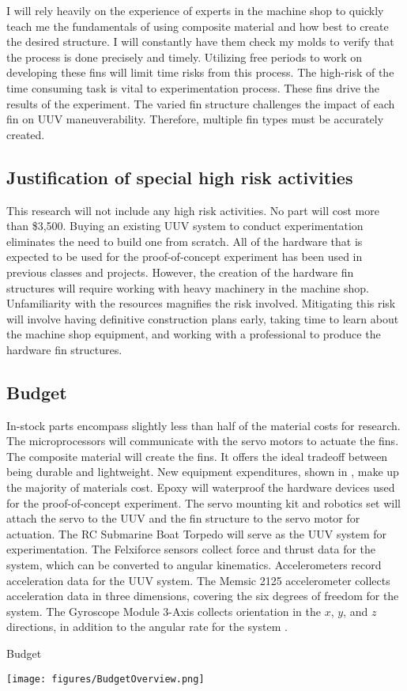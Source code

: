 \documentclass{IEEEtran}
\begin{document}
I will rely heavily on the experience of experts in the machine shop to quickly teach me the fundamentals of using composite material and how best to create the desired structure.  I will constantly have them check my molds to verify that the process is done precisely and timely.  Utilizing free periods to work on developing these fins will limit time risks from this process.  The high-risk of the time consuming task is vital to experimentation process.  These fins drive the results of the experiment.  The varied fin structure challenges the impact of each fin on UUV maneuverability.  Therefore, multiple fin types must be accurately created.

\subsection{Justification of special high risk activities}
This research will not include any high risk activities.  No part will cost more than \$3,500.  Buying an existing UUV system to conduct experimentation eliminates the need to build one from scratch.  All of the hardware that is expected to be used for the proof-of-concept experiment has been used in previous classes and projects.  However, the creation of the hardware fin structures will require working with heavy machinery in the machine shop.  Unfamiliarity with the resources magnifies the risk involved.  Mitigating this risk will involve having definitive construction plans early, taking time to learn about the machine shop equipment, and working with a professional to produce the hardware fin structures.  

\subsection{Budget}
In-stock parts encompass slightly less than half of the material costs for research.  The microprocessors will communicate with the servo motors to actuate the fins.  The composite material will create the fins.  It offers the ideal tradeoff between being durable and lightweight.  New equipment expenditures, shown in , make up the majority of materials cost.  Epoxy will waterproof the hardware devices used for the proof-of-concept experiment.  The servo mounting kit and robotics set will attach the servo to the UUV and the fin structure to the servo motor for actuation.  The RC Submarine Boat Torpedo will serve as the UUV system for experimentation.  The Felxiforce sensors collect force and thrust data for the system, which can be converted to angular kinematics.  Accelerometers record acceleration data for the UUV system.  The Memsic 2125 accelerometer collects acceleration data in three dimensions, covering the six degrees of freedom for the system.  The Gyroscope Module 3-Axis collects orientation in the $x$, $y$, and $z$ directions, in addition to the angular rate for the system \cite{parallax2013}.    
\begin{table*}[p]
\caption{Budget}
\label{tab:2}
\begin{center}
\texttt{[image: figures/BudgetOverview.png]}
\end{center}
\end{table*}
\end{document}
